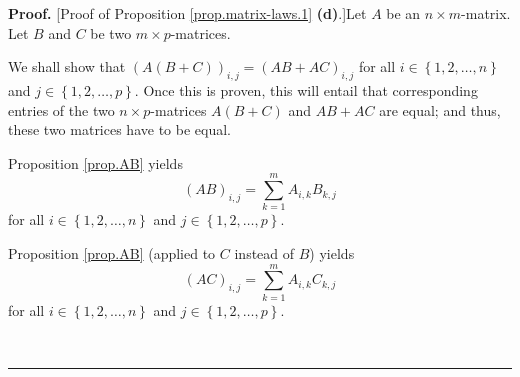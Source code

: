 \documentclass[numbers=enddot,12pt,final,onecolumn,notitlepage]{scrartcl}%
\theoremstyle{definition}
\newenvironment{proof}[1][Proof]{\noindent\textbf{#1.} }{\ \rule{0.5em}{0.5em}}
\let\sumnonlimits\sum
\renewcommand{\sum}{\sumnonlimits\limits}
\begin{document}
\begin{proof}
[Proof of Proposition \ref{prop.matrix-laws.1} \textbf{(d)}.]Let $A$ be an
$n\times m$-matrix. Let $B$ and $C$ be two $m\times p$-matrices.

We shall show that $\left(  A\left(  B+C\right)  \right)  _{i,j}=\left(
AB+AC\right)  _{i,j}$ for all $i\in\left\{  1,2,\ldots,n\right\}  $ and
$j\in\left\{  1,2,\ldots,p\right\}  $. Once this is proven, this will entail
that corresponding entries of the two $n\times p$-matrices $A\left(
B+C\right)  $ and $AB+AC$ are equal; and thus, these two matrices have to be equal.

Proposition \ref{prop.AB} yields%
\begin{equation}
\left(  AB\right)  _{i,j}=\sum_{k=1}^{m}A_{i,k}B_{k,j}
\label{pf.prop.matrix-laws.1.d.1}%
\end{equation}
for all $i\in\left\{  1,2,\ldots,n\right\}  $ and $j\in\left\{  1,2,\ldots
,p\right\}  $.

Proposition \ref{prop.AB} (applied to $C$ instead of $B$) yields%
\begin{equation}
\left(  AC\right)  _{i,j}=\sum_{k=1}^{m}A_{i,k}C_{k,j}
\label{pf.prop.matrix-laws.1.d.2}%
\end{equation}
for all $i\in\left\{  1,2,\ldots,n\right\}  $ and $j\in\left\{  1,2,\ldots
,p\right\}  $.


\end{proof}
\end{document}
